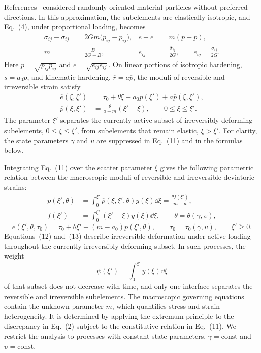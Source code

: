 References~\cite{marina2024,marina1997} considered randomly oriented material particles without preferred directions. In this approximation, the subelements are elastically isotropic, and Eq.~(4), under proportional loading, becomes
\begin{equation}
\begin{aligned}
 \overline\sigma_{ij}-\sigma_{ij}
 &=2Gm\bigl(p_{ij}-\overline p_{ij}\bigr),
 & \overline e-e&=m(p-\overline p),\\
 m&=\frac{B}{2G+B},
 & \overline e_{ij}&=\frac{\overline\sigma_{ij}}{2G},
 \qquad e_{ij}=\frac{\sigma_{ij}}{2G}.
\end{aligned}
\end{equation}
Here $p=\sqrt{p_{ij}p_{ij}}$ and $e=\sqrt{e_{ij}e_{ij}}$. On linear portions of isotropic hardening, $s=a_0p$, and kinematic hardening, $\overline r=a\overline p$, the moduli of reversible and irreversible strain satisfy
\begin{equation}
\begin{aligned}
 \overline e(\xi,\xi')
 &=\tau_0+\theta\xi+a_0p(\xi')+a\overline p(\xi,\xi'),\\
 \overline p(\xi,\xi')
 &=\frac{\theta}{a+m}(\xi'-\xi),
 \qquad 0\leq\xi\leq\xi'.
\end{aligned}
\end{equation}
The parameter $\xi'$ separates the currently active subset of irreversibly deforming subelements, $0\leq\xi\leq\xi'$, from subelements that remain elastic, $\xi>\xi'$. For clarity, the state parameters $\gamma$ and $\upsilon$ are suppressed in Eq.~(11) and in the formulas below.

Integrating Eq.~(11) over the scatter parameter $\xi$ gives the following parametric relation between the macroscopic moduli of reversible and irreversible deviatoric strains:
\begin{equation}
\begin{aligned}
 p(\xi',\theta)
 &=\int_0^{\xi'}\overline p(\xi,\xi',\theta)y(\xi)\dd\xi
 =\frac{\theta f(\xi')}{m+a},\\
 f(\xi')&=\int_0^{\xi'}(\xi'-\xi)y(\xi)\dd\xi,
 \qquad \theta=\theta(\gamma,\upsilon),
\end{aligned}
\end{equation}
\begin{equation}
 e(\xi',\theta,\tau_0)
 =\tau_0+\theta\xi'-(m-a_0)p(\xi',\theta),
 \qquad
 \tau_0=\tau_0(\gamma,\upsilon),
 \qquad \xi'\geq0.
\end{equation}
Equations~(12) and~(13) describe irreversible deformation under active loading throughout the currently irreversibly deforming subset. In such processes, the weight
\[
 \psi(\xi')=\int_0^{\xi'}y(\xi)\dd\xi
\]
of that subset does not decrease with time, and only one interface separates the reversible and irreversible subelements. The macroscopic governing equations contain the unknown parameter $m$, which quantifies stress and strain heterogeneity. It is determined by applying the extremum principle to the discrepancy in Eq.~(2) subject to the constitutive relation in Eq.~(11). We restrict the analysis to processes with constant state parameters, $\gamma=\text{const}$ and $\upsilon=\text{const}$.

